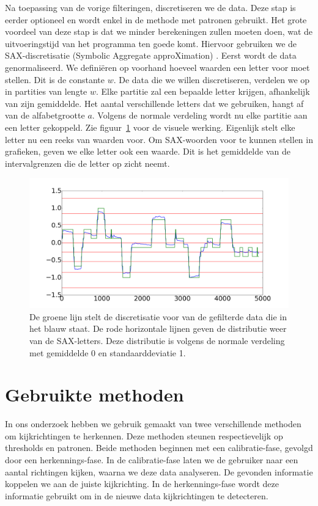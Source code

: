 \documentclass{article}
\begin{document}
Na toepassing van de vorige filteringen, discretiseren we de data. Deze stap is eerder optioneel en wordt enkel in de methode met patronen gebruikt. Het grote voordeel van deze stap is dat we minder berekeningen zullen moeten doen, wat de uitvoeringstijd van het programma ten goede komt. Hiervoor gebruiken we de SAX-discretisatie (Symbolic Aggregate approXimation) \cite{sax}. Eerst wordt de data genormaliseerd. We definiëren op voorhand hoeveel waarden een letter voor moet stellen. Dit is de constante $w$. De data die we willen discretiseren, verdelen we op in partities van lengte $w$. Elke partitie zal een bepaalde letter krijgen, afhankelijk van zijn gemiddelde. Het aantal verschillende letters dat we gebruiken, hangt af van de alfabetgrootte $a$. Volgens de normale verdeling wordt nu elke partitie aan een letter gekoppeld. Zie figuur~\ref{fig:discretization} voor de visuele werking. Eigenlijk stelt elke letter nu een reeks van waarden voor. Om SAX-woorden voor te kunnen stellen in grafieken, geven we elke letter ook een waarde. Dit is het gemiddelde van de intervalgrenzen die de letter op zicht neemt.

\begin{figure}[h]
\centering
\includegraphics[width=\linewidth]{images/sax_normaal_verdeling}
\caption{De groene lijn stelt de discretisatie voor van de gefilterde data die in het blauw staat. De rode horizontale lijnen geven de distributie weer van de SAX-letters. Deze distributie is volgens de normale verdeling met gemiddelde 0 en standaarddeviatie 1.}
\label{fig:discretization}
\end{figure}

\section{Gebruikte methoden}

In ons onderzoek hebben we gebruik gemaakt van twee verschillende methoden om kijkrichtingen te herkennen. Deze methoden steunen respectievelijk op thresholds en patronen. Beide methoden beginnen met een calibratie-fase, gevolgd door een herkennings-fase. In de calibratie-fase laten we de gebruiker naar een aantal richtingen kijken, waarna we deze data analyseren. De gevonden informatie koppelen we aan de juiste kijkrichting. In de herkennings-fase wordt deze informatie gebruikt om in de nieuwe data kijkrichtingen te detecteren.
\end{document}
